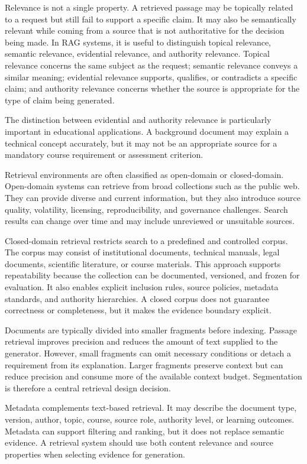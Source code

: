 \documentclass[12pt,a4paper]{report}
\numberwithin{equation}{chapter}
\begin{document}
Relevance is not a single property. A retrieved passage may be topically related to a request but still fail to support a specific claim. It may also be semantically relevant while coming from a source that is not authoritative for the decision being made. In RAG systems, it is useful to distinguish topical relevance, semantic relevance, evidential relevance, and authority relevance. Topical relevance concerns the same subject as the request; semantic relevance conveys a similar meaning; evidential relevance supports, qualifies, or contradicts a specific claim; and authority relevance concerns whether the source is appropriate for the type of claim being generated.

The distinction between evidential and authority relevance is particularly important in educational applications. A background document may explain a technical concept accurately, but it may not be an appropriate source for a mandatory course requirement or assessment criterion.

Retrieval environments are often classified as open-domain or closed-domain. Open-domain systems can retrieve from broad collections such as the public web. They can provide diverse and current information, but they also introduce source quality, volatility, licensing, reproducibility, and governance challenges. Search results can change over time and may include unreviewed or unsuitable sources.

Closed-domain retrieval restricts search to a predefined and controlled corpus. The corpus may consist of institutional documents, technical manuals, legal documents, scientific literature, or course materials. This approach supports repeatability because the collection can be documented, versioned, and frozen for evaluation. It also enables explicit inclusion rules, source policies, metadata standards, and authority hierarchies. A closed corpus does not guarantee correctness or completeness, but it makes the evidence boundary explicit.

Documents are typically divided into smaller fragments before indexing. Passage retrieval improves precision and reduces the amount of text supplied to the generator. However, small fragments can omit necessary conditions or detach a requirement from its explanation. Larger fragments preserve context but can reduce precision and consume more of the available context budget. Segmentation is therefore a central retrieval design decision.

Metadata complements text-based retrieval. It may describe the document type, version, author, topic, course, source role, authority level, or learning outcomes. Metadata can support filtering and ranking, but it does not replace semantic evidence. A retrieval system should use both content relevance and source properties when selecting evidence for generation.
\end{document}
